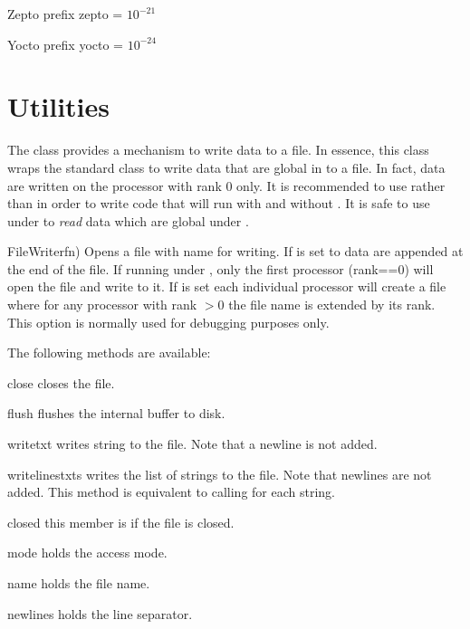 \begin{datadesc}{Zepto}
prefix zepto = $10^{-21}$
\end{datadesc}

\begin{datadesc}{Yocto}
prefix yocto = $10^{-24}$
\end{datadesc}

\section{Utilities}
The  class provides a mechanism to write data to a file.
In essence, this class wraps the standard \PYTHON {} class to write
data that are global in \MPI to a file. In fact, data are written on the
processor with \MPI rank 0 only. It is recommended to use 
rather than  in order to write code that will run with and without
\MPI. It is safe to use  under \MPI to \emph{read} data which are
global under \MPI.

\begin{classdesc}{FileWriter}{fn)}
Opens a file with name  for writing. If  is set to \True
data are appended at the end of the file.
If running under \MPI, only the first processor (rank==0) will open the file
and write to it.
If  is set each individual processor will create a file
where for any processor with rank $> 0$ the file name is extended by its rank.
This option is normally used for debugging purposes only.
\end{classdesc}

\vspace{1em}\noindent The following methods are available:
\begin{methoddesc}[FileWriter]{close}{}
closes the file.
\end{methoddesc}
\begin{methoddesc}[FileWriter]{flush}{}
flushes the internal buffer to disk.
\end{methoddesc}
\begin{methoddesc}[FileWriter]{write}{txt}
writes string  to the file. Note that a newline is not added.
\end{methoddesc}
\begin{methoddesc}[FileWriter]{writelines}{txts}
writes the list  of strings to the file.
Note that newlines are not added.
This method is equivalent to calling  for each string.
\end{methoddesc}
\begin{memberdesc}[FileWriter]{closed}
this member is \True if the file is closed.
\end{memberdesc}
\begin{memberdesc}[FileWriter]{mode}
holds the access mode.
\end{memberdesc}
\begin{memberdesc}[FileWriter]{name}
holds the file name.
\end{memberdesc}
\begin{memberdesc}[FileWriter]{newlines}
holds the line separator.
\end{memberdesc}

